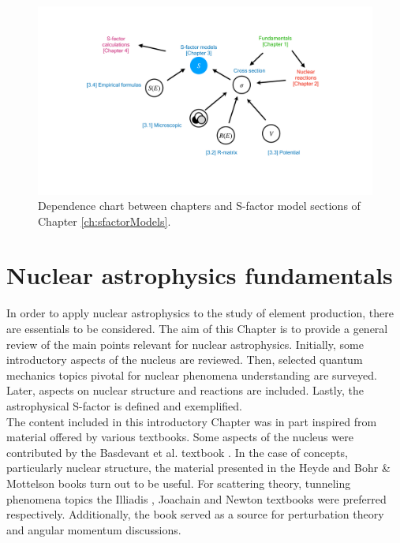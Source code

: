 \documentclass[openany]{book}
\begin{document}
\begin{figure}[H]
	\centering 
	\includegraphics[scale=0.28]{Graphs/DependenceChart}
	\caption[Dependence chart.]{Dependence chart between chapters and S-factor model sections of Chapter \ref{ch:sfactorModels}.}
	\label{fig:DependenceChart}
\end{figure}

\chapter{Nuclear astrophysics fundamentals}  \label{ch:nuclearAstrophysics}

In order to apply nuclear astrophysics to the study of element production, there are essentials to be considered. The aim of this Chapter is to provide a general review of the main points relevant for nuclear astrophysics. Initially, some introductory aspects of the nucleus are reviewed. Then, selected quantum mechanics topics pivotal for nuclear phenomena understanding are surveyed. Later, aspects on nuclear structure and reactions are included. Lastly, the astrophysical S-factor is defined and exemplified. \\

The content included in this introductory Chapter was in part inspired from material offered by various textbooks. Some aspects of the nucleus were contributed by the Basdevant et al. textbook \cite{basdevant_rich_spiro_2004}. In the case of concepts, particularly nuclear structure, the material presented in the Heyde \cite{heyde_2004} and Bohr \& Mottelson \cite{bohr_mottelson_1998} books turn out to be useful. For scattering theory, tunneling phenomena topics the Illiadis \cite{iliadis_2015}, Joachain \cite{joachain_1975} and Newton \cite{newton_2002} textbooks were preferred respectively. Additionally, the book \cite{dick_2016} served as a source for perturbation theory and angular momentum discussions.
\end{document}

